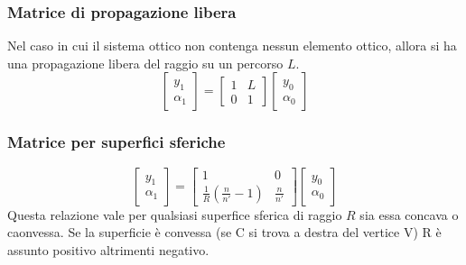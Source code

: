 \documentclass{article}
\begin{document}
\subsubsection*{Matrice di propagazione libera}
Nel caso in cui il sistema ottico non contenga nessun elemento ottico, allora si ha una propagazione libera del raggio su un percorso $L$.
\[
\begin{bmatrix}
y_1\\
\alpha_1
\end{bmatrix}
=
\begin{bmatrix}
1	&	L\\
0	&	1
\end{bmatrix}
\begin{bmatrix}
y_0\\
\alpha_0
\end{bmatrix}
\]

\subsubsection*{Matrice per superfici sferiche}
\[
\begin{bmatrix}
y_1\\
\alpha_1
\end{bmatrix}
=
\begin{bmatrix}
1	&	0\\
\frac{1}{R}(\frac{n}{n'}-1)	&	\frac{n}{n'}
\end{bmatrix}
\begin{bmatrix}
y_0\\
\alpha_0
\end{bmatrix}
\]
Questa relazione vale per qualsiasi superfice sferica di raggio $R$ sia essa concava o caonvessa. Se la superficie è convessa (se C si trova a destra del vertice V) R è assunto positivo altrimenti negativo.
\end{document}

